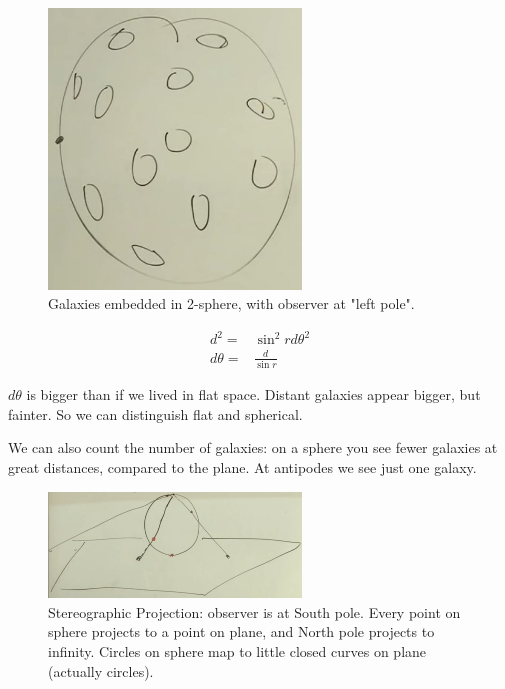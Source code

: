 \documentclass[]{article}
\begin{document}
\begin{figure}[H]
	\caption{Galaxies embedded in 2-sphere, with observer at "left pole".}
	\begin{center}
		\includegraphics[width=0.6\textwidth]{cosmo-3-galaxies-2-sphere}
	\end{center}
\end{figure}

\begin{align*}
	d^2 =& \sin^2 r d\theta^2\\
	d\theta =& \frac{d}{\sin r}
\end{align*}

$d\theta$ is bigger than if we lived in flat space. Distant galaxies appear bigger, but fainter. So we can distinguish flat and spherical.

We can also count the number of galaxies: on  a sphere you see fewer galaxies at great distances, compared to the plane. At antipodes we see just one galaxy.

\begin{figure}[H]
	\caption[Stereographic Projection]{Stereographic Projection: observer is at South pole. Every point on sphere projects to a point on plane, and North pole projects to infinity. Circles on sphere map to little closed curves on plane (actually circles).}
	\begin{center}
			\includegraphics[width=0.6\textwidth]{cosmo-3-stereographic-projection}
	\end{center}
\end{figure}
\end{document}

